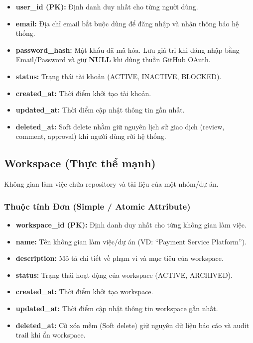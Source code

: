 \begin{itemize}
    \item \textbf{user\_id (PK):} Định danh duy nhất cho từng người dùng.
    \item \textbf{email:} Địa chỉ email bắt buộc dùng để đăng nhập và nhận thông báo hệ thống.
    \item \textbf{password\_hash:} Mật khẩu đã mã hóa. Lưu giá trị khi đăng nhập bằng Email/Password và giữ \textbf{NULL} khi dùng thuần GitHub OAuth.
    \item \textbf{status:} Trạng thái tài khoản (ACTIVE, INACTIVE, BLOCKED).
    \item \textbf{created\_at:} Thời điểm khởi tạo tài khoản.
    \item \textbf{updated\_at:} Thời điểm cập nhật thông tin gần nhất.
    \item \textbf{deleted\_at:} Soft delete nhằm giữ nguyên lịch sử giao dịch (review, comment, approval) khi người dùng rời hệ thống.
\end{itemize}


\subsection{Workspace (Thực thể mạnh)}

Không gian làm việc chứa repository và tài liệu của một nhóm/dự án.

\subsubsection{Thuộc tính Đơn (Simple / Atomic Attribute)}

\begin{itemize}
    \item \textbf{workspace\_id (PK):} Định danh duy nhất cho từng không gian làm việc.
    \item \textbf{name:} Tên không gian làm việc/dự án (VD: ``Payment Service Platform'').
    \item \textbf{description:} Mô tả chi tiết về phạm vi và mục tiêu của workspace.
    \item \textbf{status:} Trạng thái hoạt động của workspace (ACTIVE, ARCHIVED).
    \item \textbf{created\_at:} Thời điểm khởi tạo workspace.
    \item \textbf{updated\_at:} Thời điểm cập nhật thông tin workspace gần nhất.
    \item \textbf{deleted\_at:} Cờ xóa mềm (Soft delete) giữ nguyên dữ liệu báo cáo và audit trail khi ẩn workspace.
\end{itemize}


